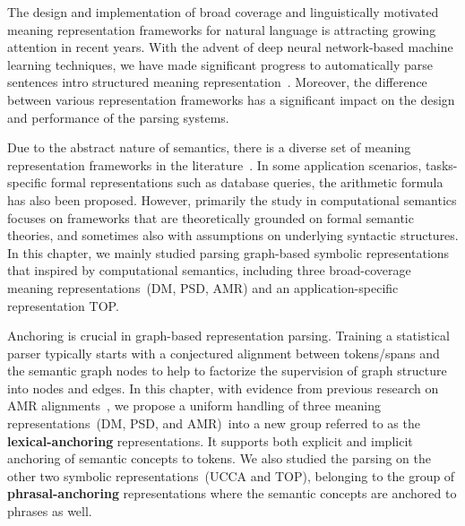 The design and implementation of broad coverage and linguistically
motivated meaning representation frameworks for natural language is
attracting growing attention in recent years. With the advent of deep
neural network-based machine learning techniques, we have made
significant progress to automatically parse sentences intro structured
meaning
representation~\citep{Oep:Kuh:Miy:14,Oep:Kuh:Miy:15,May:2016wc,hershcovich-etal-2019-semeval}. Moreover,
the difference between various representation frameworks has a
significant impact on the design and performance of the parsing
systems.

Due to the abstract nature of semantics, there is a diverse set of
meaning representation frameworks in the
literature~\citep{abend2017state}. In some application scenarios,
tasks-specific formal representations such as database queries,
the arithmetic formula has also been proposed. However, primarily the study
in computational semantics focuses on frameworks that are
theoretically grounded on formal semantic theories, and sometimes also
with assumptions on underlying syntactic structures. In this chapter,
we mainly studied parsing graph-based symbolic representations that
inspired by computational semantics, including three broad-coverage
meaning representations~(DM, PSD, AMR) and an application-specific
representation TOP.

Anchoring is crucial in graph-based representation parsing. Training a
statistical parser typically starts with a conjectured alignment
between tokens/spans and the semantic graph nodes to help to factorize
the supervision of graph structure into nodes and edges. In this
chapter, with evidence from previous research on AMR
alignments~\citep{Pourdamghani:2014aligning,Flanigan:2014vc,Wang:2017vt,chen2017unsupervised,szubert2018structured,lyu2018amr},
we propose a uniform handling of three meaning representations~(DM,
PSD, and AMR)~into a new group referred to as the
\textbf{lexical-anchoring} representations. It supports both explicit and implicit
anchoring of semantic concepts to tokens. We also studied the parsing
on the other two symbolic representations~(UCCA and TOP), belonging to
the group of \textbf{phrasal-anchoring} representations where the semantic
concepts are anchored to phrases as well.


